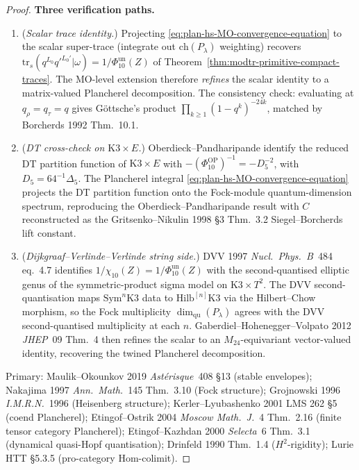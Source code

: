 \begin{proof}
\textbf{Three verification paths.}
\begin{enumerate}[label=\textup{(V\arabic*)}]
\item (\emph{Scalar trace identity.}) Projecting
\eqref{eq:plan-hs-MO-convergence-equation} to the scalar super-trace
(integrate out $\mathrm{ch}(P_\lambda)$ weighting) recovers
$\mathrm{tr}_s(q^{L_0} q'^{L_0'} | \omega) = 1/\Phi_{10}^{\mathrm{un}}(Z)$
of Theorem~\ref{thm:modtr-primitive-compact-traces}. The MO-level extension therefore
\emph{refines} the scalar identity to a matrix-valued Plancherel
decomposition. The consistency check: evaluating at
$q_\rho = q_\tau = q$ gives G\"ottsche's product
$\prod_{k \geq 1}(1 - q^k)^{-24k}$, matched by Borcherds 1992
Thm.~10.1.
\item (\emph{DT cross-check on $\mathrm K3 \times E$.})
Oberdieck--Pandharipande identify the reduced DT partition function of
$\mathrm K3 \times E$ with
$-(\Phi_{10}^{\mathrm{OP}})^{-1}=-D_5^{-2}$, with
$D_5=64^{-1}\Delta_5$. The Plancherel integral
\eqref{eq:plan-hs-MO-convergence-equation} projects the DT partition
function onto the Fock-module quantum-dimension spectrum, reproducing
the Oberdieck--Pandharipande result with $C$ reconstructed as the
Gritsenko--Nikulin 1998 \S 3 Thm.~3.2 Siegel--Borcherds lift constant.
\item (\emph{Dijkgraaf--Verlinde--Verlinde string side.}) DVV 1997
\emph{Nucl.\ Phys.\ B}~484 eq.~4.7 identifies
$1/\chi_{10}(Z) = 1/\Phi_{10}^{\mathrm{un}}(Z)$ with the second-quantised elliptic
genus of the symmetric-product sigma model on $\mathrm K3 \times T^2$.
The DVV second-quantisation maps $\mathrm{Sym}^n\mathrm K3$ data to
$\mathrm{Hilb}^{[n]}\mathrm K3$ via the Hilbert--Chow morphism, so the
Fock multiplicity $\dim_{\mathrm{qu}}(P_\lambda)$ agrees with the DVV
second-quantised multiplicity at each $n$. Gaberdiel--Hohenegger--Volpato
2012 \emph{JHEP}~09 Thm.~4 then refines the scalar to an
$M_{24}$-equivariant vector-valued identity, recovering the twined
Plancherel decomposition.
\end{enumerate}

Primary: Maulik--Okounkov 2019 \emph{Ast\'erisque}~408 \S 13
(stable envelopes);
Nakajima 1997 \emph{Ann.\ Math.}~145 Thm.~3.10 (Fock structure);
Grojnowski 1996 \emph{I.M.R.N.}~1996 (Heisenberg structure);
Kerler--Lyubashenko 2001 LMS 262 \S 5 (coend Plancherel);
Etingof--Ostrik 2004 \emph{Moscow Math.\ J.}~4 Thm.~2.16
(finite tensor category Plancherel);
Etingof--Kazhdan 2000 \emph{Selecta}~6 Thm.~3.1 (dynamical
quasi-Hopf quantisation); Drinfeld 1990 Thm.~1.4 ($H^2$-rigidity);
Lurie HTT \S 5.3.5 (pro-category Hom-colimit).
\end{proof}

